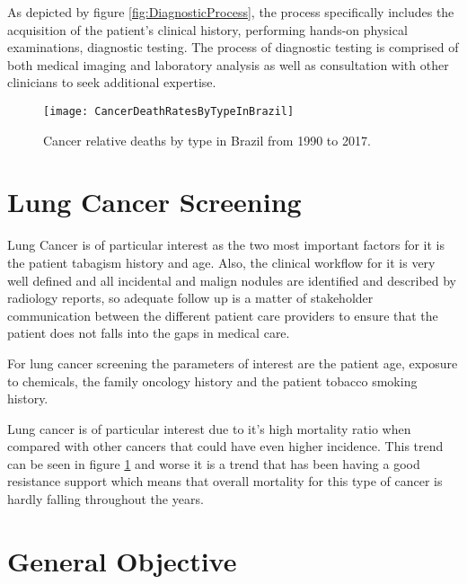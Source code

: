 As depicted by figure \ref{fig:DiagnosticProcess}, the process specifically includes the acquisition of the patient’s clinical history, performing hands-on physical examinations, diagnostic testing. The process of diagnostic testing is comprised of both medical imaging and laboratory analysis as well as consultation with other clinicians to seek additional expertise.

\begin{figure}
\begin{centering}
\texttt{[image: CancerDeathRatesByTypeInBrazil]}
\par\end{centering}
\caption{\label{fig:cancer_deaths_in_brazil}Cancer relative deaths by type in Brazil from 1990 to 2017.}

\end{figure}

\section{Lung Cancer Screening}

Lung Cancer is of particular interest as the two most important factors for it is the patient tabagism history and age\cite{fleischner2017}. Also, the clinical workflow for it is very well defined and all incidental and malign nodules are identified and described by radiology reports, so adequate follow up is a matter of stakeholder communication between the different patient care providers to ensure that the patient does not falls into the gaps in medical care. 

For lung cancer screening the parameters of interest are the patient age, exposure to chemicals, the family oncology history and the patient tobacco smoking history\cite{fleischner2017, parasuraman2000, jaklitsch2012}.

Lung cancer is of particular interest due to it's high mortality ratio when compared with other cancers that could have even higher incidence. This trend can be seen in figure \ref{fig:cancer_deaths_in_brazil} and worse it is a trend that has been having a good resistance support which means that overall mortality for this type of cancer is hardly falling throughout the years.

\section{General Objective}

